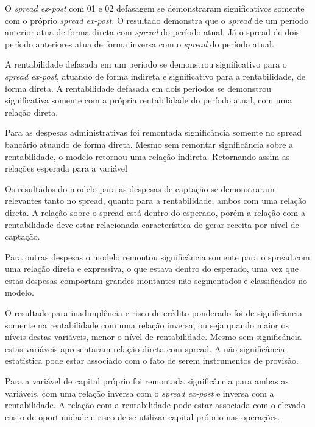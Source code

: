 \documentclass[
  12pt,
  12pt,
  openright,
  oneside,
  a4paper,
  chapter=TITLE,
  section=TITLE,
  subsection=TITLE,
  subsubsection=TITLE,
  english,
  portugues,
  sumario=tradicional]{abntex2}
\begin{document}
\label{tb:pvargmm}
\vspace{-2mm}
\vspace{20pt}

\parindent 1.50cm

\vspace{20pt}

O \emph{spread ex-post} com 01 e 02 defasagem se demonstraram significativos somente com o próprio \emph{spread ex-post}. O resultado demonstra que o \emph{spread} de um período anterior atua de forma direta com \emph{spread} do período atual. Já o spread de dois período anteriores atua de forma inversa com o \emph{spread} do período atual.

A rentabilidade defasada em um período se demonstrou significativo para o \emph{spread ex-post}, atuando de forma indireta e significativo para a rentabilidade, de forma direta. A rentabilidade defasada em dois períodos se demonstrou significativa somente com a própria rentabilidade do período atual, com uma relação direta.

Para as despesas administrativas foi remontada significância somente no spread bancário atuando de forma direta. Mesmo sem remontar significância sobre a rentabilidade, o modelo retornou uma relação indireta. Retornando assim as relações esperada para a variável

Os resultados do modelo para as despesas de captação se demonstraram relevantes tanto no spread, quanto para a rentabilidade, ambos com uma relação direta. A relação sobre o spread está dentro do esperado, porém a relação com a rentabilidade deve estar relacionada característica de gerar receita por nível de captação.

Para outras despesas o modelo remontou significância somente para o spread,com uma relação direta e expressiva, o que estava dentro do esperado, uma vez que estas despesas comportam grandes montantes não segmentados e classificados no modelo.

O resultado para inadimplência e risco de crédito ponderado foi de significância somente na rentabilidade com uma relação inversa, ou seja quando maior os níveis destas variáveis, menor o nível de rentabilidade. Mesmo sem significância estas variáveis apresentaram relação direta com spread. A não significância estatística pode estar associado com o fato de serem instrumentos de provisão.

Para a variável de capital próprio foi remontada significância para ambas as variáveis, com uma relação inversa com o \emph{spread ex-post} e inversa com a rentabilidade. A relação com a rentabilidade pode estar associada com o elevado custo de oportunidade e risco de se utilizar capital próprio nas operações.
\end{document}
